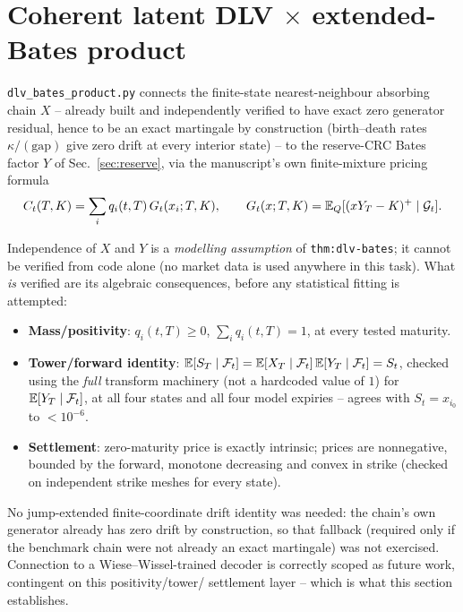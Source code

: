 \section{Coherent latent DLV $\times$ extended-Bates product}
\label{sec:dlv-product}

\texttt{dlv\_bates\_product.py} connects the finite-state nearest-neighbour
absorbing chain $X$ -- already built and independently verified to have
exact zero generator residual, hence to be an exact martingale by
construction (birth--death rates $\kappa/(\text{gap})$ give zero drift at
every interior state) -- to the reserve-CRC Bates factor $Y$ of
Sec.~\ref{sec:reserve}, via the manuscript's own finite-mixture pricing
formula
\[
  C_t(T,K)=\sum_i q_i(t,T)\,G_t(x_i;T,K),\qquad
  G_t(x;T,K)=\mathbb E_Q[(xY_T-K)^+\mid\mathcal G_t].
\]

Independence of $X$ and $Y$ is a \emph{modelling assumption} of
\texttt{thm:dlv-bates}; it cannot be verified from code alone (no market
data is used anywhere in this task). What \emph{is} verified are its
algebraic consequences, before any statistical fitting is attempted:

\begin{itemize}
\item \textbf{Mass/positivity}: $q_i(t,T)\ge0$, $\sum_iq_i(t,T)=1$, at every
  tested maturity.
\item \textbf{Tower/forward identity}: $\mathbb E[S_T\mid\mathcal F_t]
  =\mathbb E[X_T\mid\mathcal F_t]\,\mathbb E[Y_T\mid\mathcal F_t]=S_t$, checked using the
  \emph{full} transform machinery (not a hardcoded value of $1$) for
  $\mathbb E[Y_T\mid\mathcal F_t]$, at all four states and all four model
  expiries -- agrees with $S_t=x_{i_0}$ to $<10^{-6}$.
\item \textbf{Settlement}: zero-maturity price is exactly intrinsic; prices
  are nonnegative, bounded by the forward, monotone decreasing and convex
  in strike (checked on independent strike meshes for every state).
\end{itemize}

No jump-extended finite-coordinate drift identity was needed: the chain's
own generator already has zero drift by construction, so that fallback
(required only if the benchmark chain were not already an exact martingale)
was not exercised. Connection to a Wiese--Wissel-trained decoder is
correctly scoped as future work, contingent on this positivity/tower/
settlement layer -- which is what this section establishes.
